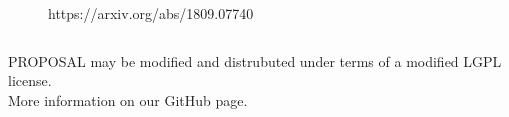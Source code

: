 \documentclass[aspectratio=1610, captions=tableheading, 11pt]{beamer}
\begin{document}
\begin{frame}[t]
\begin{minipage}[t][0.8\textheight][t]{\textwidth}
\begin{columns}
\begin{figure}
          \captionsetup{format=myformat}
          \caption*{https://arxiv.org/abs/1809.07740 \\ \phantom{astroparticlephysics/PROPOSAL}}
      \end{figure}
  \end{columns}
  \end{minipage}
  \vfill
  \begin{minipage}{\textwidth}
      \smaller
      \begin{center}
      PROPOSAL may be modified and distrubuted under terms of a modified LGPL license.\\More information on our GitHub page.
      \end{center}
  \end{minipage}
\end{frame}
\end{document}
